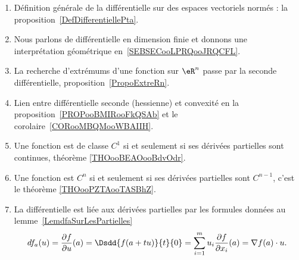 \begin{enumerate}
    \item
        Définition générale de la différentielle sur des espaces vectoriels normés : la proposition~\ref{DefDifferentiellePta}.
    \item
        Nous parlons de différentielle en dimension finie et donnons une interprétation géométrique en~\ref{SEBSECooLPRQooJRQCFL}.
    \item
        La recherche d'extrémums d'une fonction sur \( \eR^n\) passe par la seconde différentielle, proposition~\ref{PropoExtreRn}.
    \item
        Lien entre différentielle seconde (hessienne) et convexité en la proposition~\ref{PROPooBMIRooFkQSAb} et le corolaire~\ref{CORooMBQMooWBAIIH}.
    \item
        Une fonction est de classe \( C^1\) si et seulement si ses dérivées partielles sont continues, théorème \ref{THOooBEAOooBdvOdr}.
    \item
        Une fonction est \( C^n\) si et seulement si ses dérivées partielles sont \( C^{n-1}\), c'est le théorème \ref{THOooPZTAooTASBhZ}.
    \item
        La différentielle est liée aux dérivées partielles par les formules données au lemme~\ref{LemdfaSurLesPartielles}
	\begin{equation*}
        df_a(u)=\frac{ \partial f }{ \partial u }(a)=\Dsdd{ f(a+tu) }{t}{0}=\sum_{i=1}^mu_i\frac{ \partial f }{ \partial x_i }(a)=\nabla f(a)\cdot u.
	\end{equation*}
\end{enumerate}

